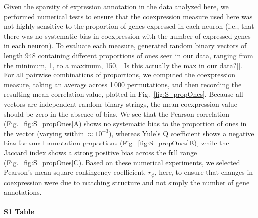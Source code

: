 \documentclass[10pt,letterpaper]{article}
\begin{document}
Given the sparsity of expression annotation in the data analyzed here, we performed numerical tests to ensure that the coexpression measure used here was not highly sensitive to the proportion of genes expressed in each neuron (i.e., that there was no systematic bias in coexpression with the number of expressed genes in each neuron).
To evaluate each measure, generated random binary vectors of length 948 containing different proportions of ones seen in our data, ranging from the minimum, 1, to a maximum, 150, [[Is this actually the max in our data?]].
For all pairwise combinations of proportions, we computed the coexpression measure, taking an average across 1\,000 permutations, and then recording the resulting mean correlation value, plotted in Fig.~\ref{fig:S_propOnes}.
Because all vectors are independent random binary strings, the mean coexpression value should be zero in the absence of bias.
We see that the Pearson correlation (Fig.~\ref{fig:S_propOnes}A) shows no systematic bias to the proportion of ones in the vector (varying within $\approx 10^{-3}$), whereas Yule's Q coefficient shows a negative bias for small annotation proportions (Fig.~\ref{fig:S_propOnes}B), while the Jaccard index shows a strong positive bias across the full range (Fig.~\ref{fig:S_propOnes}C).
Based on these numerical experiments, we selected Pearson's mean square contingency coefficient, $r_\phi$, here, to ensure that changes in coexpression were due to matching structure and not simply the number of gene annotations.

\paragraph*{S1 Table}
\end{document}
